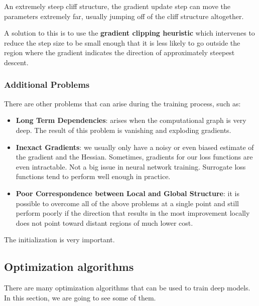 An extremely steep cliff structure, the gradient update step can move the
parameters extremely far, usually jumping off of the cliff structure altogether.

A solution to this is to use the \textbf{gradient clipping heuristic} which
intervenes to reduce the step size to be small enough that it is less likely to
go outside the region where the gradient indicates the direction of approximately
steepest descent.
\subsubsection{Additional Problems}
There are other problems that can arise during the training process, such as:
\begin{itemize}
    \item \textbf{Long Term Dependencies}: arises when the computational graph
          is very deep. The result of this problem is vanishing and exploding
          gradients.
    \item \textbf{Inexact Gradients}: we usually only have a noisy or even biased
          estimate of the gradient and the Hessian. Sometimes, gradients for our
          loss functions are even intractable. Not a big issue in neural network
          training. Surrogate loss functions tend to perform well enough in practice.
    \item \textbf{Poor Correspondence between Local and Global Structure}: it is
          possible to overcome all of the above problems at a single point and
          still perform poorly if the direction that results in the most
          improvement locally does not point toward distant regions of much
          lower cost.
\end{itemize}
\begin{note}
    The initialization is very important.
\end{note}
\subsection{Optimization algorithms}
There are many optimization algorithms that can be used to train deep models.
In this section, we are going to see some of them.
